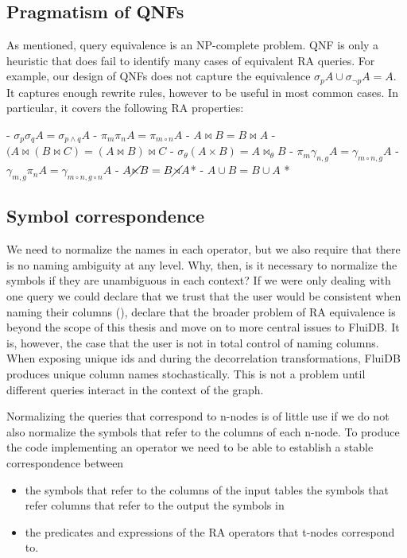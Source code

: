 \subsection{Pragmatism of QNFs}

As mentioned, query equivalence is an NP-complete problem. QNF is only
a heuristic that does fail to identify many cases of equivalent RA
queries.  For example, our design of QNFs does not capture the
equivalence \(\sigma_p A \cup \sigma_{\neg p} A = A\). It captures
enough rewrite rules, however to be useful in most common cases. In
particular, it covers the following RA properties:

- \(\sigma_p \sigma_q A = \sigma_{p \land q} A\)
- \(\pi_m \pi_{n} A = \pi_{m \circ n} A\)
- \(A \Join B = B \Join A\)
- \((A \Join (B \Join C) = (A \Join B) \Join C\)
- \(\sigma_\theta (A \times B) = A \Join_\theta B\)
- \(\pi_m \gamma_{n,g} A = \gamma_{m \circ n,g} A \)
- \(\gamma_{m,g} \pi_n A = \gamma_{m \circ n,g \circ n} A \)
- \(A \cancel\ltimes B = B \cancel\rtimes A \)*
- \(A \cup B = B \cup A \) *

\subsection{Symbol correspondence}
\label{sec:symbol_correspondence}

We need to normalize the names in each operator, but we also require
that there is no naming ambiguity at any level. Why, then, is it
necessary to normalize the symbols if they are unambiguous in each
context? If we were only dealing with one query we could declare that
we trust that the user would be consistent when naming their columns
(), declare that the broader problem
of RA equivalence is beyond the scope of this thesis and move on to
more central issues to FluiDB. It is, however, the case that the user
is not in total control of naming columns. When exposing unique ids
and during the decorrelation transformations, FluiDB produces unique
column names stochastically. This is not a problem until different
queries interact in the context of the graph.

Normalizing the queries that correspond to n-nodes is of little use
if we do not also normalize the symbols that refer to the columns
of each n-node. To produce the code implementing
an operator we need to be able to establish a stable correspondence
between

\begin{itemize}
\item the symbols that refer to the columns of the input tables the
  symbols that refer columns that refer to the output the symbols in
\item the predicates and expressions of the RA operators that t-nodes
  correspond to.
\end{itemize}

